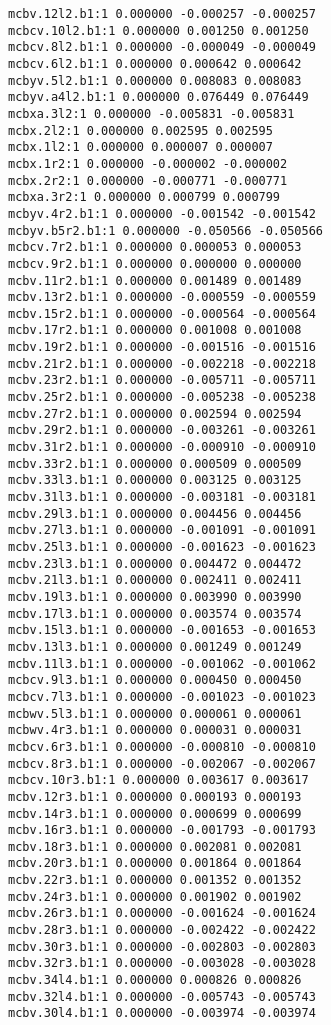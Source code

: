 \begin{verbatim}
mcbv.12l2.b1:1 0.000000 -0.000257 -0.000257
mcbcv.10l2.b1:1 0.000000 0.001250 0.001250
mcbcv.8l2.b1:1 0.000000 -0.000049 -0.000049
mcbcv.6l2.b1:1 0.000000 0.000642 0.000642
mcbyv.5l2.b1:1 0.000000 0.008083 0.008083
mcbyv.a4l2.b1:1 0.000000 0.076449 0.076449
mcbxa.3l2:1 0.000000 -0.005831 -0.005831
mcbx.2l2:1 0.000000 0.002595 0.002595
mcbx.1l2:1 0.000000 0.000007 0.000007
mcbx.1r2:1 0.000000 -0.000002 -0.000002
mcbx.2r2:1 0.000000 -0.000771 -0.000771
mcbxa.3r2:1 0.000000 0.000799 0.000799
mcbyv.4r2.b1:1 0.000000 -0.001542 -0.001542
mcbyv.b5r2.b1:1 0.000000 -0.050566 -0.050566
mcbcv.7r2.b1:1 0.000000 0.000053 0.000053
mcbcv.9r2.b1:1 0.000000 0.000000 0.000000
mcbv.11r2.b1:1 0.000000 0.001489 0.001489
mcbv.13r2.b1:1 0.000000 -0.000559 -0.000559
mcbv.15r2.b1:1 0.000000 -0.000564 -0.000564
mcbv.17r2.b1:1 0.000000 0.001008 0.001008
mcbv.19r2.b1:1 0.000000 -0.001516 -0.001516
mcbv.21r2.b1:1 0.000000 -0.002218 -0.002218
mcbv.23r2.b1:1 0.000000 -0.005711 -0.005711
mcbv.25r2.b1:1 0.000000 -0.005238 -0.005238
mcbv.27r2.b1:1 0.000000 0.002594 0.002594
mcbv.29r2.b1:1 0.000000 -0.003261 -0.003261
mcbv.31r2.b1:1 0.000000 -0.000910 -0.000910
mcbv.33r2.b1:1 0.000000 0.000509 0.000509
mcbv.33l3.b1:1 0.000000 0.003125 0.003125
mcbv.31l3.b1:1 0.000000 -0.003181 -0.003181
mcbv.29l3.b1:1 0.000000 0.004456 0.004456
mcbv.27l3.b1:1 0.000000 -0.001091 -0.001091
mcbv.25l3.b1:1 0.000000 -0.001623 -0.001623
mcbv.23l3.b1:1 0.000000 0.004472 0.004472
mcbv.21l3.b1:1 0.000000 0.002411 0.002411
mcbv.19l3.b1:1 0.000000 0.003990 0.003990
mcbv.17l3.b1:1 0.000000 0.003574 0.003574
mcbv.15l3.b1:1 0.000000 -0.001653 -0.001653
mcbv.13l3.b1:1 0.000000 0.001249 0.001249
mcbv.11l3.b1:1 0.000000 -0.001062 -0.001062
mcbcv.9l3.b1:1 0.000000 0.000450 0.000450
mcbcv.7l3.b1:1 0.000000 -0.001023 -0.001023
mcbwv.5l3.b1:1 0.000000 0.000061 0.000061
mcbwv.4r3.b1:1 0.000000 0.000031 0.000031
mcbcv.6r3.b1:1 0.000000 -0.000810 -0.000810
mcbcv.8r3.b1:1 0.000000 -0.002067 -0.002067
mcbcv.10r3.b1:1 0.000000 0.003617 0.003617
mcbv.12r3.b1:1 0.000000 0.000193 0.000193
mcbv.14r3.b1:1 0.000000 0.000699 0.000699
mcbv.16r3.b1:1 0.000000 -0.001793 -0.001793
mcbv.18r3.b1:1 0.000000 0.002081 0.002081
mcbv.20r3.b1:1 0.000000 0.001864 0.001864
mcbv.22r3.b1:1 0.000000 0.001352 0.001352
mcbv.24r3.b1:1 0.000000 0.001902 0.001902
mcbv.26r3.b1:1 0.000000 -0.001624 -0.001624
mcbv.28r3.b1:1 0.000000 -0.002422 -0.002422
mcbv.30r3.b1:1 0.000000 -0.002803 -0.002803
mcbv.32r3.b1:1 0.000000 -0.003028 -0.003028
mcbv.34l4.b1:1 0.000000 0.000826 0.000826
mcbv.32l4.b1:1 0.000000 -0.005743 -0.005743
mcbv.30l4.b1:1 0.000000 -0.003974 -0.003974

\end{verbatim}
